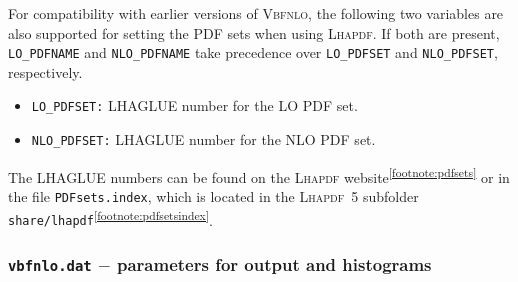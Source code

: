 \documentclass[english,12pt]{article}
\begin{document}
For compatibility with earlier versions of \textsc{Vbfnlo}, the following
two variables are also supported for setting the PDF sets when using \textsc{Lhapdf}. If both are
present, {\tt LO\_PDFNAME} and {\tt NLO\_PDFNAME} take precedence over
{\tt LO\_PDFSET} and {\tt NLO\_PDFSET}, respectively.
\begin{itemize}
\item {\tt LO\_PDFSET:} LHAGLUE number for the LO PDF set.
\item {\tt NLO\_PDFSET:} LHAGLUE number for the NLO PDF set.
\end{itemize}
The LHAGLUE numbers can be found on the \textsc{Lhapdf} 
website\textsuperscript{\ref{footnote:pdfsets}}
or in the file {\tt PDFsets.index}, which is located in the \textsc{Lhapdf}~5 subfolder 
{\tt share/lhapdf}\textsuperscript{\ref{footnote:pdfsetsindex}}.



\subsubsection{{\tt vbfnlo.dat} $-$  parameters for output and histograms}
\label{sec:hist}
\end{document}
